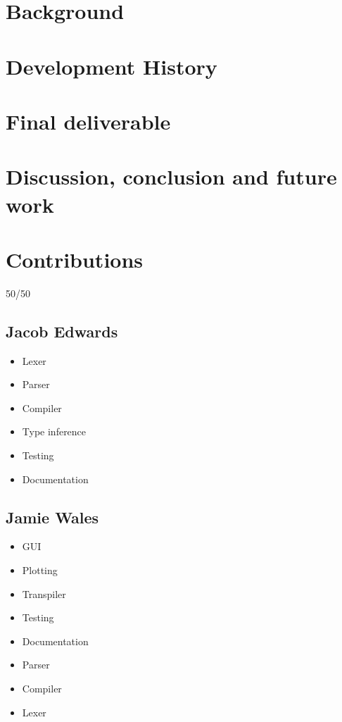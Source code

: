 \documentclass[a4paper, oneside, 11pt]{report}
\begin{document}
\chapter{Background}\label{ch:background}

\chapter{Development History}\label{ch:devhist}



\chapter{Final deliverable}\label{ch:impl}



\chapter{Discussion, conclusion and future work}\label{ch:discussion-conclusion-and-future-work}




\appendix
\chapter{Contributions}\label{ch:contributions}

50/50

\section{Jacob Edwards}\label{sec:jacob-edwards}

\begin{itemize}
    \item Lexer
    \item Parser
    \item Compiler
    \item Type inference
    \item Testing
    \item Documentation
\end{itemize}

\section{Jamie Wales}\label{sec:jamie-wales}

\begin{itemize}
    \item GUI
    \item Plotting
    \item Transpiler
    \item Testing
    \item Documentation
    \item Parser
    \item Compiler
    \item Lexer
\end{itemize}
\end{document}
